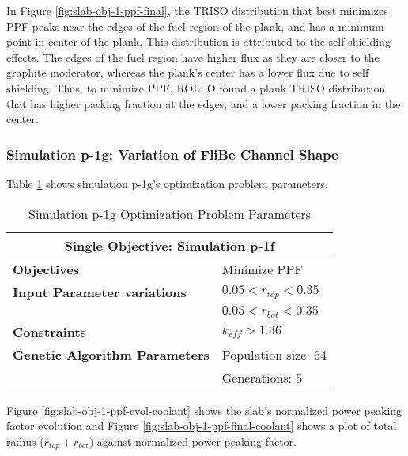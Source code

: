 In Figure \ref{fig:slab-obj-1-ppf-final}, the TRISO distribution that best minimizes 
PPF peaks near the edges of the fuel region of the plank, and has a minimum point in 
center of the plank.
This distribution is attributed to the self-shielding effects. 
The edges of the fuel region have higher flux as they are closer to the graphite 
moderator, whereas the plank's center has a lower flux due to self shielding. 
Thus, to minimize PPF, \gls{ROLLO} found a plank TRISO distribution that has higher 
packing fraction at the edges, and a lower packing fraction in the center. 

\subsubsection{Simulation p-1g: Variation of FliBe Channel Shape}
Table \ref{tab:simulationp1g} shows simulation p-1g's optimization problem parameters. 
\begin{table}[htbp]
    \centering
    \onehalfspacing
    \caption{Simulation p-1g Optimization Problem Parameters}
	\label{tab:simulationp1g}
    \footnotesize
    \begin{tabular}{l|p{3cm}}
    \hline 
    \multicolumn{2}{c}{\textbf{Single Objective: Simulation p-1f}} \\
    \hline 
    \textbf{Objectives} & Minimize PPF \\
    \hline 
    \textbf{Input Parameter variations} & $0.05<r_{top}<0.35$ \\
    & $0.05<r_{bot}<0.35$ \\
    \hline
    \textbf{Constraints} & $k_{eff} > 1.36$\\ 
    \hline 
    \textbf{Genetic Algorithm Parameters} & Population size: 64 \\
    & Generations: 5 \\
    \hline
    \end{tabular}
\end{table}
Figure \ref{fig:slab-obj-1-ppf-evol-coolant} shows the slab's normalized power peaking 
factor evolution and Figure \ref{fig:slab-obj-1-ppf-final-coolant} shows a plot of total 
radius ($r_{top} + r_{bot}$) against normalized power peaking factor. 
